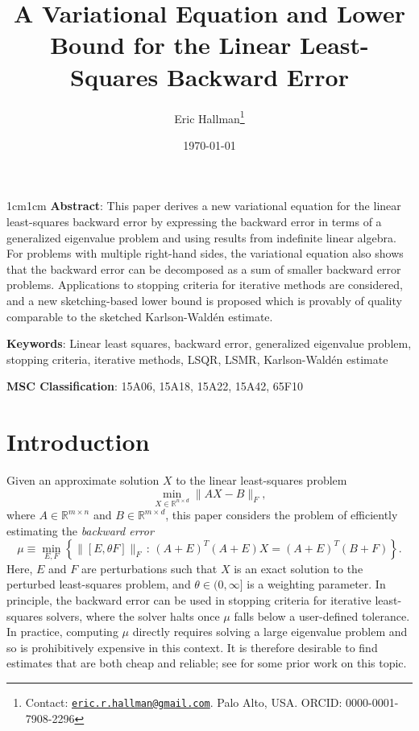 \documentclass{article}
\title{A Variational Equation and Lower Bound for the Linear Least-Squares Backward Error}
\author{Eric Hallman\thanks{Contact: \href{eric.r.hallman@gmail.com}{\texttt{eric.r.hallman@gmail.com}}. Palo Alto, USA. ORCID: 0000-0001-7908-2296}}
\date{\today}
\newcommand{\ts}{^T}
\begin{document}
\maketitle
    \begin{changemargin}{1cm}{1cm}
    \begingroup
    \footnotesize
    {\bf Abstract}: This paper derives a new variational equation for the linear least-squares backward error by expressing the backward error in terms of a generalized eigenvalue problem and using results from indefinite linear algebra. For problems with multiple right-hand sides, the variational equation also shows that the backward error can be decomposed as a sum of smaller backward error problems. Applications to stopping criteria for iterative methods are considered, and a new sketching-based lower bound is proposed which is provably of quality comparable to the sketched Karlson-Wald\'{e}n estimate.
    \endgroup
    \end{changemargin}


\begingroup
\footnotesize
{\bf Keywords}: Linear least squares, backward error, generalized eigenvalue problem, stopping criteria, iterative methods, LSQR, LSMR, Karlson-Wald\'{e}n estimate
\endgroup

\begingroup
\footnotesize
{\bf MSC Classification}: 15A06, 15A18, 15A22, 15A42, 65F10
\endgroup

\section{Introduction}
Given an approximate solution $X$ to the linear least-squares problem 
\begin{equation*}
    \min_{X\in \mathbb{R}^{n\times d}} \|AX-B\|_F,
\end{equation*}
where $A\in \mathbb{R}^{m\times n}$ and $B\in \mathbb{R}^{m\times d}$, this paper considers the problem of efficiently estimating the {\em backward error} 
\begin{equation}\label{def:backward_error}
    \mu \equiv \min_{E,F}\left\{\|[E, \theta F]\|_F\,:\, (A+E)\ts (A+E)X = (A+E)\ts (B+F)\right\}.
\end{equation}
Here, $E$ and $F$ are perturbations such that $X$ is an exact solution to the perturbed least-squares problem, and $\theta \in (0,\infty]$ is a weighting parameter. In principle, the backward error can be used in stopping criteria for iterative least-squares solvers, where the solver halts once $\mu$ falls below a user-defined tolerance. In practice, computing $\mu$ directly requires solving a large eigenvalue problem and so is prohibitively expensive in this context. It is therefore desirable to find estimates that are both cheap and reliable; see \cite{karlson1997estimation, jiranek2010estimating, gratton2013simple, hallman2020estimating,epperly2026fast} for some prior work on this topic.
\end{document}
